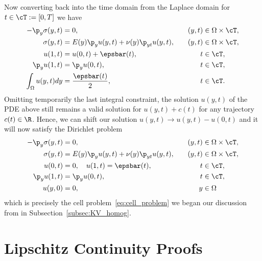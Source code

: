 \documentclass[letterpaper,11pt]{article}
\begin{document}
Now converting back into the time domain from the Laplace domain for $t \in \cT := [0, T]$ we have
\begin{subequations}
    \begin{align}
        -\p_y\sigma(y, t) &= 0, &\quad (y, t) &\in \Omega \times \cT,\\
        \sigma(y, t) &= E(y)\p_yu(y, t) + \nu(y)\p_{yt}u(y, t), &\quad (y, t) &\in \Omega \times \cT,\\
        u(1, t) &= u(0, t)+\epsbar(t), &t&\in\cT,\\
        \p_y u(1, t) &= \p_y u(0, t), &t&\in\cT,\\
        \int_{\Omega} u(y, t)dy &= \frac{\epsbar(t)}{2}, &t&\in\cT.
    \end{align}
\end{subequations}
Omitting temporarily the last integral constraint, the solution $u(y, t)$ of the PDE above still remains a valid solution for $u(y, t) + c(t)$ for any trajectory $c(t) \in \R$. Hence, we can shift our solution $u(y, t) \to u(y, t) - u(0, t)$ and it will now satisfy the Dirichlet problem
\begin{subequations}
    \begin{align}
        -\p_y\sigma(y, t) &= 0, &\quad (y, t) &\in \Omega \times \cT,\\
        \sigma(y, t) &= E(y)\p_yu(y, t) + \nu(y)\p_{yt}u(y, t), &\quad (y, t) &\in \Omega \times \cT,\\
        u(0, t) &= 0, \quad u(1, t) = \epsbar(t), &t&\in\cT,\\
        \p_y u(1, t) &= \p_y u(0, t), &t&\in\cT,\\
        u(y, 0) &= 0, &y&\in\Omega
    \end{align}
\end{subequations}
which is precisely the cell problem~\eqref{eq:cell_problem} we began our discussion from in Subsection~\ref{subsec:KV_homog}.

\section{Lipschitz Continuity Proofs}\label{sec:Lip}
\end{document}
